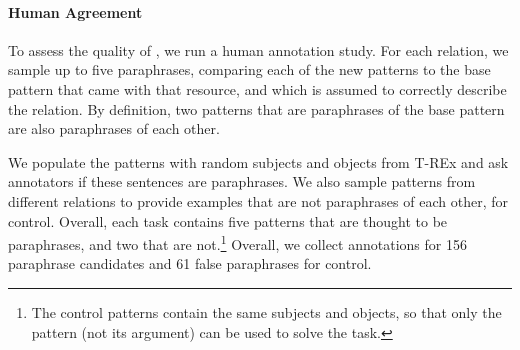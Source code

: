 







\paragraph{Human Agreement}
To assess the quality of \resource{}, we run a
human annotation study.
For each relation, we sample up to
five paraphrases, comparing each of the new patterns to the base pattern that came with that resource, and which is assumed to correctly describe the relation.
By definition, two patterns that are paraphrases of the base pattern are also paraphrases of each other.

We populate the patterns with random subjects and objects from T-REx \cite{trex} and ask annotators if these sentences are paraphrases.
We also sample patterns from different relations to provide examples that are not paraphrases of each other, for control.
Overall, each task contains five patterns that are thought
to be paraphrases, and two that are not.\footnote{The
  control patterns contain the same subjects and objects, so
  that only the pattern (not its argument) can be used to
  solve the task.}
Overall, we collect annotations for 156 paraphrase candidates and 61 false paraphrases for control.

